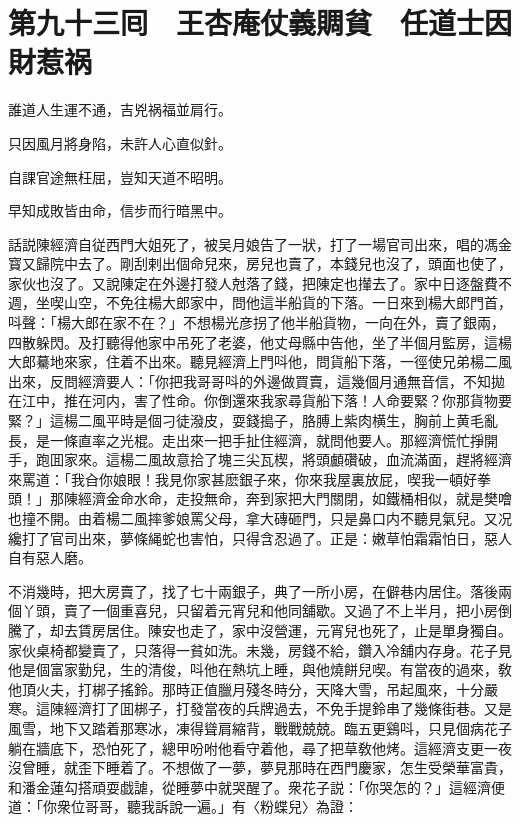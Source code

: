 \chapter*{第九十三囘　王杏庵仗義賙貧　任道士因財惹祸}

誰道人生運不通，吉兇祸福並肩行。

只因風月將身陷，未許人心直似針。

自課官途無枉屈，豈知天道不昭明。

早知成敗皆由命，信步而行暗黑中。

話説陳經濟自従西門大姐死了，被吴月娘告了一狀，打了一場官司出來，唱的馮金寳又歸院中去了。剛刮剌出個命兒來，房兒也賣了，本錢兒也沒了，頭面也使了，家伙也沒了。又說陳定在外邊打發人尅落了錢，把陳定也攆去了。家中日逐盤費不週，坐喫山空，不免往楊大郎家中，問他這半船貨的下落。一日來到楊大郎門首，呌聲：「楊大郎在家不在？」不想楊光彦拐了他半船貨物，一向在外，賣了銀兩，四散躲閃。及打聽得他家中吊死了老婆，他丈母縣中告他，坐了半個月監房，這楊大郎驀地來家，住着不出來。聽見經濟上門呌他，問貨船下落，一徑使兄弟楊二風出來，反問經濟要人：「你把我哥哥呌的外邊做買賣，這幾個月通無音信，不知拋在江中，推在河内，害了性命。你倒還來我家尋貨船下落！人命要緊？你那貨物要緊？」這楊二風平時是個刁徒潑皮，耍錢搗子，胳膊上紫肉横生，胸前上黄毛亂長，是一條直率之光棍。走出來一把手扯住經濟，就問他要人。那經濟慌忙掙開手，跑囬家來。這楊二風故意拾了塊三尖瓦楔，將頭顱礸破，血流滿面，趕將經濟來罵道：「我㒲你娘眼！我見你家甚麽銀子來，你來我屋裏放屁，喫我一頓好拳頭！」那陳經濟金命水命，走投無命，奔到家把大門關閉，如鐵桶相似，就是樊噲也撞不開。由着楊二風摔爹娘罵父母，拿大磚砸門，只是鼻口内不聽見氣兒。又况纔打了官司出來，夢條䋲蛇也害怕，只得含忍過了。正是：嫩草怕霜霜怕日，惡人自有惡人磨。

不消幾時，把大房賣了，找了七十兩銀子，典了一所小房，在僻巷内居住。落後兩個丫頭，賣了一個重喜兒，只留着元宵兒和他同舖歇。又過了不上半月，把小房倒騰了，却去賃房居住。陳安也走了，家中沒營運，元宵兒也死了，止是單身獨自。家伙桌椅都變賣了，只落得一貧如洗。未幾，房錢不給，鑽入冷舖内存身。花子見他是個富家勤兒，生的清俊，呌他在熱坑上睡，與他燒餅兒喫。有當夜的過來，敎他頂火夫，打梆子搖鈴。那時正值臘月殘冬時分，天降大雪，吊起風來，十分嚴寒。這陳經濟打了囬梆子，打發當夜的兵牌過去，不免手提鈴串了幾條街巷。又是風雪，地下又踏着那寒冰，凍得聳肩縮背，戰戰兢兢。臨五更鷄呌，只見個病花子躺在牆底下，恐怕死了，總甲吩咐他看守着他，尋了把草敎他烤。這經濟支更一夜沒曾睡，就歪下睡着了。不想做了一夢，夢見那時在西門慶家，怎生受榮華富貴，和潘金蓮勾搭頑耍戯謔，從睡夢中就哭醒了。衆花子説：「你哭怎的？」這經濟便道：「你衆位哥哥，聽我訴說一遍。」有〈粉蝶兒〉為證：

